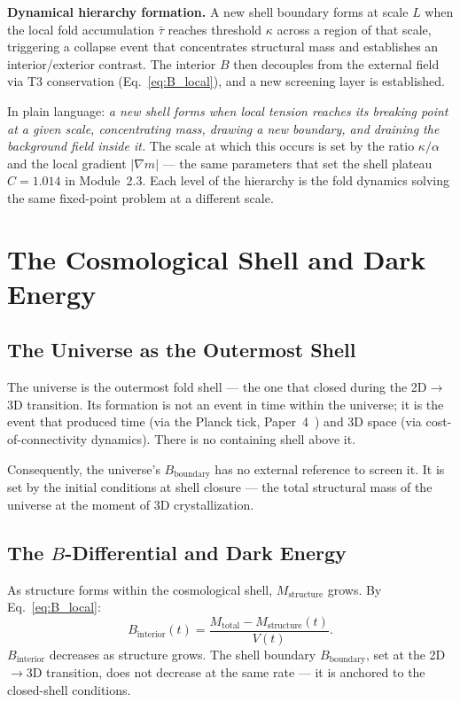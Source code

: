 \documentclass[12pt]{article}
\newcommand{\taubar}{\bar{\tau}}
\begin{document}
\textbf{Dynamical hierarchy formation.}
A new shell boundary forms at scale $L$ when the local fold
accumulation $\taubar$ reaches threshold $\kappa$ across a
region of that scale, triggering a collapse event that
concentrates structural mass and establishes an interior/exterior
contrast. The interior $B$ then decouples from the external field
via T3 conservation (Eq.~\ref{eq:B_local}), and a new screening
layer is established.

In plain language: \emph{a new shell forms when local tension
reaches its breaking point at a given scale, concentrating mass,
drawing a new boundary, and draining the background field inside it.}
The scale at which this occurs is set by the ratio $\kappa/\alpha$
and the local gradient $|\nabla m|$ --- the same parameters that
set the shell plateau $C = 1.014$ in Module~2.3.
Each level of the hierarchy is the fold dynamics solving the same
fixed-point problem at a different scale.

\section{The Cosmological Shell and Dark Energy}

\subsection{The Universe as the Outermost Shell}

The universe is the outermost fold shell --- the one that closed during
the 2D$\to$3D transition. Its formation is not an event in time within
the universe; it is the event that produced time (via the Planck tick,
Paper~4~\cite{planck_tick}) and 3D space (via cost-of-connectivity
dynamics). There is no containing shell above it.

Consequently, the universe's $B_{\mathrm{boundary}}$ has no external
reference to screen it. It is set by the initial conditions at shell
closure --- the total structural mass of the universe at the moment of
3D crystallization.

\subsection{The $B$-Differential and Dark Energy}

As structure forms within the cosmological shell, $M_{\mathrm{structure}}$
grows. By Eq.~\eqref{eq:B_local}:
\begin{equation}
  B_{\mathrm{interior}}(t) = \frac{M_{\mathrm{total}} -
  M_{\mathrm{structure}}(t)}{V(t)}.
\end{equation}
$B_{\mathrm{interior}}$ decreases as structure grows.
The shell boundary $B_{\mathrm{boundary}}$, set at the 2D$\to$3D
transition, does not decrease at the same rate --- it is anchored
to the closed-shell conditions.
\end{document}
